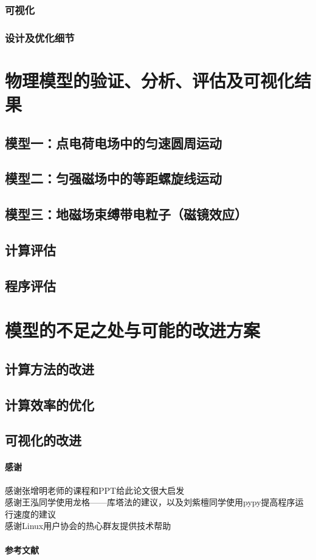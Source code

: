 \documentclass[UTF-8,cs4size]{ctexart}
\begin{document}
\subsubsection{可视化}
\subsubsection{设计及优化细节}
\section{物理模型的验证、分析、评估及可视化结果}
\subsection{模型一：点电荷电场中的匀速圆周运动}
\subsection{模型二：匀强磁场中的等距螺旋线运动}
\subsection{模型三：地磁场束缚带电粒子（磁镜效应）}
\subsection{计算评估}
\subsection{程序评估}
\section{模型的不足之处与可能的改进方案}
\subsection{计算方法的改进}
\subsection{计算效率的优化}
\subsection{可视化的改进}


\paragraph{感谢}
感谢张增明老师的课程和PPT给此论文很大启发\\
感谢王泓同学使用龙格——库塔法的建议，以及刘紫檀同学使用pypy提高程序运行速度的建议\\
感谢Linux用户协会的热心群友提供技术帮助
\paragraph{参考文献}
\end{document}
